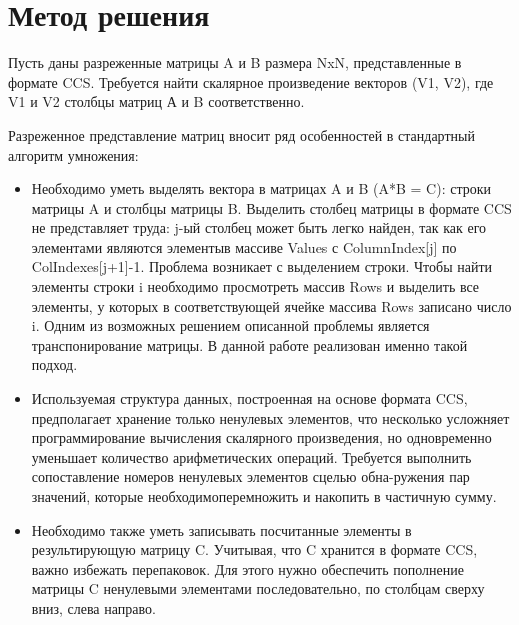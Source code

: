 \documentclass{report}
\begin{document}
\section*{Метод решения}
\par Пусть даны разреженные матрицы A и B размера NxN, представленные в формате CCS. Требуется найти скалярное произведение векторов (V1, V2), где V1 и V2 столбцы матриц А и B соответственно.
\par Разреженное  представление матриц вносит ряд особенностей в стандартный алгоритм умножения:
\begin{itemize}
\item Необходимо уметь выделять вектора в матрицах A и B (A*B = C): строки матрицы A и столбцы матрицы B. Выделить столбец матрицы в формате CCS не представляет труда: j-ый столбец может быть легко найден, так  как его элементами  являются элементыв  массиве Values с ColumnIndex[j] по ColIndexes[j+1]-1. Проблема возникает с выделением строки. Чтобы найти элементы строки i необходимо просмотреть массив Rows и выделить все элементы, у которых в соответствующей ячейке массива Rows записано число i. Одним из возможных решением описанной проблемы является транспонирование матрицы. В данной работе реализован именно такой подход.
\item Используемая структура  данных,  построенная  на  основе  формата CCS, предполагает хранение только ненулевых элементов, что несколько усложняет программирование вычисления скалярного произведения, но одновременно уменьшает количество арифметических операций. Требуется выполнить сопоставление номеров ненулевых элементов сцелью обна-ружения пар значений, которые необходимоперемножить и накопить в частичную сумму.
\item Необходимо также уметь записывать посчитанные  элементы в результирующую матрицу C. Учитывая, что C хранится в формате CCS, важно избежать перепаковок. Для этого нужно обеспечить пополнение матрицы C ненулевыми элементами последовательно, по столбцам сверху вниз, слева направо.
\end{itemize}
\newpage

\end{document}
